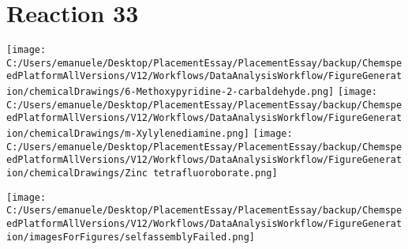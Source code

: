 \documentclass{article}%
\begin{document}
\section*{Reaction 33}%
%
\begin{scheme}[H]%
\begin{minipage}{0.5\textwidth}%
\texttt{[image: C:/Users/emanuele/Desktop/PlacementEssay/PlacementEssay/backup/ChemspeedPlatformAllVersions/V12/Workflows/DataAnalysisWorkflow/FigureGeneration/chemicalDrawings/6-Methoxypyridine-2-carbaldehyde.png]}%
\texttt{[image: C:/Users/emanuele/Desktop/PlacementEssay/PlacementEssay/backup/ChemspeedPlatformAllVersions/V12/Workflows/DataAnalysisWorkflow/FigureGeneration/chemicalDrawings/m-Xylylenediamine.png]}%
\texttt{[image: C:/Users/emanuele/Desktop/PlacementEssay/PlacementEssay/backup/ChemspeedPlatformAllVersions/V12/Workflows/DataAnalysisWorkflow/FigureGeneration/chemicalDrawings/Zinc tetrafluoroborate.png]}%
\end{minipage}%
\begin{minipage}{0.5\textwidth}%
\begin{center}%
\texttt{[image: C:/Users/emanuele/Desktop/PlacementEssay/PlacementEssay/backup/ChemspeedPlatformAllVersions/V12/Workflows/DataAnalysisWorkflow/FigureGeneration/imagesForFigures/selfassemblyFailed.png]}%
\end{center}%
\end{minipage}%
\caption{Self-assembly of components 6, 18, with Zinc(II) in a 3.0:1.5:1.0 molar ratio in CH$_3$CN at 60\textdegree C for 40h. These are the reagents (starting materials) for reaction 33.}%
\end{scheme}%
\end{document}

